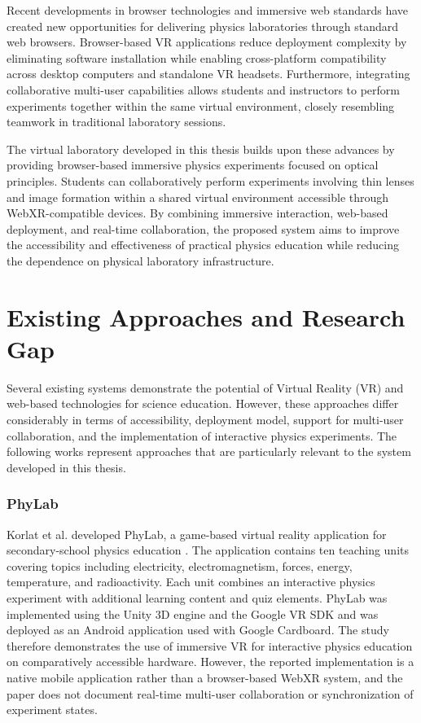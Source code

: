 Recent developments in browser technologies and immersive web standards have created new opportunities for delivering physics laboratories through standard web browsers. Browser-based VR applications reduce deployment complexity by eliminating software installation while enabling cross-platform compatibility across desktop computers and standalone VR headsets. Furthermore, integrating collaborative multi-user capabilities allows students and instructors to perform experiments together within the same virtual environment, closely resembling teamwork in traditional laboratory sessions.

The virtual laboratory developed in this thesis builds upon these advances by providing browser-based immersive physics experiments focused on optical principles. Students can collaboratively perform experiments involving thin lenses and image formation within a shared virtual environment accessible through WebXR-compatible devices. By combining immersive interaction, web-based deployment, and real-time collaboration, the proposed system aims to improve the accessibility and effectiveness of practical physics education while reducing the dependence on physical laboratory infrastructure.

\section{Existing Approaches and Research Gap}
\label{sec:existing_approaches}

Several existing systems demonstrate the potential of Virtual Reality (VR)
and web-based technologies for science education. However, these approaches
differ considerably in terms of accessibility, deployment model, support for
multi-user collaboration, and the implementation of interactive physics
experiments. The following works represent approaches that are particularly
relevant to the system developed in this thesis.

\subsubsection*{PhyLab}

Korlat et al. developed PhyLab, a game-based virtual reality application for
secondary-school physics education \cite{korlat2024phylab}. The application
contains ten teaching units covering topics including electricity,
electromagnetism, forces, energy, temperature, and radioactivity. Each unit
combines an interactive physics experiment with additional learning content
and quiz elements. PhyLab was implemented using the Unity 3D engine and the
Google VR SDK and was deployed as an Android application used with Google
Cardboard. The study therefore demonstrates the use of immersive VR for
interactive physics education on comparatively accessible hardware. However,
the reported implementation is a native mobile application rather than a
browser-based WebXR system, and the paper does not document real-time
multi-user collaboration or synchronization of experiment states.


